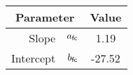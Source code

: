 \begin{tabular}{rcc}
\hline
\multicolumn{2}{c}{\textbf{Parameter}} &  \textbf{Value} 
\\ \hline
Slope & $a_\mathsf{fc}$ & 1.19
\\ 
Intercept & $b_\mathsf{fc}$ & -27.52
\\ \hline
\end{tabular}